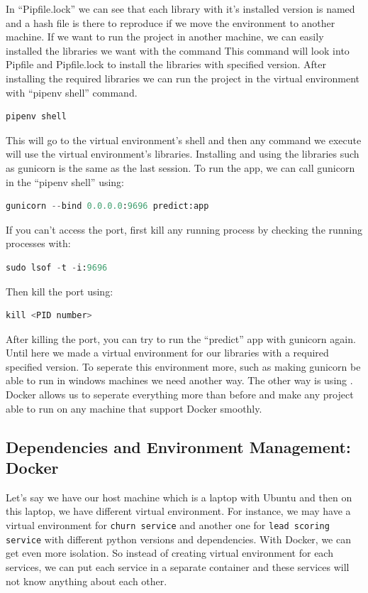 \documentclass[letterpaper,12pt,notitlepage,twoside]{report}
\begin{document}
In ``Pipfile.lock'' we can see that each library with it's installed version is named and a hash file is there to reproduce if we move the environment to another machine.
If we want to run the project in another machine, we can easily installed the libraries we want with the command  This command will look into Pipfile and Pipfile.lock to install the libraries with specified version. After installing the required libraries we can run the project in the virtual environment with ``pipenv shell'' command. 
\begin{lstlisting}[language=python, numbers=none]
pipenv shell
\end{lstlisting}

This will go to the virtual environment's shell and then any command we execute will use the virtual environment's libraries. Installing and using the libraries such as gunicorn is the same as the last session.  To run the  app, we can call gunicorn in the ``pipenv shell'' using:

\begin{lstlisting}[language=python, numbers=none]
gunicorn --bind 0.0.0.0:9696 predict:app
\end{lstlisting}

If you can't access the port, first kill any running process by checking the running processes with:
\begin{lstlisting}[language=python, numbers=none]
sudo lsof -t -i:9696
\end{lstlisting}

Then kill the port using:
\begin{lstlisting}[language=python, numbers=none]
kill <PID number>
\end{lstlisting}

After killing the port, you can try to run the ``predict'' app with gunicorn again. Until here we made a virtual environment for our libraries with a required specified version. To seperate this environment more, such as making gunicorn be able to run in windows machines we need another way. The other way is using . Docker allows us to seperate everything more than before and make any project able to run on any machine that support Docker smoothly.

\subsection{Dependencies and Environment Management: Docker}
Let's say we have our host machine which is a laptop with Ubuntu and then on this laptop, we have different virtual environment. For instance, we may have a virtual environment for \texttt{churn service} and another one for \texttt{lead scoring service} with different python versions and dependencies. With Docker, we can get even more isolation. So instead of creating virtual environment for each services, we can put each service in a separate container and these services will not know anything about each other.
\end{document}
